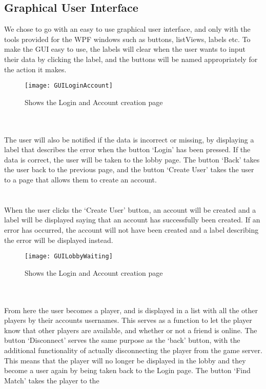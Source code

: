 		\subsection{Graphical User Interface}
We chose to go with an easy to use graphical user interface, and only with the
 tools provided for the WPF windows such as buttons, listViews, labels etc. To
 make the GUI easy to use, the labels will clear when the user wants to input
  their data by clicking the label, and the buttons will be named appropriately
	 for the action it makes.
\begin{figure}[h]
	\centerline{\texttt{[image: GUILoginAccount]}}
	\caption{Shows the Login and Account creation  page}
\end{figure}
\\
\\
The user will also be notified if the data is incorrect or missing, by
 displaying a label that describes the error when the button ‘Login’ has
  been pressed. If the data is correct, the user will be taken to the lobby
	page. The button ‘Back’ takes the user back to the previous page, and the
	 button ‘Create User’ takes the user to a page that allows them to create
	  an account.
\\
\\
\\
When the user clicks the ‘Create User’ button, an account will be created
and a label will be displayed saying that an account has successfully been
 created. If an error has occurred, the account will not have been created
 and a label describing the error will be displayed instead.
\begin{figure}[h]
	\centerline{\texttt{[image: GUILobbyWaiting]}}
	\caption{Shows the Login and Account creation  page}
\end{figure}
\\
\\
From here the user becomes a player, and is displayed in a list with all
 the other players by their accounts usernames. This serves as a function to
 let the player know that other players are available, and whether or not a
  friend is online. The button ‘Disconnect’ serves the same purpose as the
	‘back’ button, with the additional functionality of actually disconnecting
	 the player from the game server. This means that the player will no longer
	  be displayed in the lobby and they become a user again by being taken back
		 to the Login page. The button ‘Find Match’ takes the player to the

